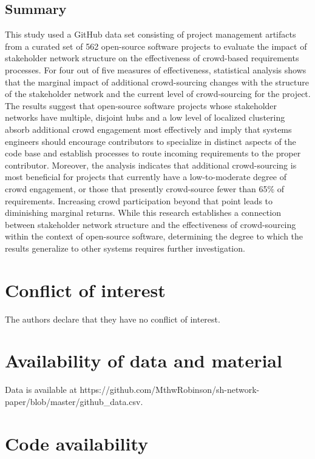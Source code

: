 \subsection{Summary}

This study used a GitHub data set consisting of project management artifacts from a curated set of 562 open-source software projects to evaluate the impact of stakeholder network structure on the effectiveness of crowd-based requirements processes. For four out of five measures of effectiveness, statistical analysis shows that the marginal impact of additional crowd-sourcing changes with the structure of the stakeholder network and the current level of crowd-sourcing for the project. The results suggest that open-source software projects whose stakeholder networks have multiple, disjoint hubs and a low level of localized clustering absorb additional crowd engagement most effectively and imply that systems engineers should encourage contributors to specialize in distinct aspects of the code base and establish processes to route incoming requirements to the proper contributor. Moreover, the analysis indicates that additional crowd-sourcing is most beneficial for projects that currently have a low-to-moderate degree of crowd engagement, or those that presently crowd-source fewer than 65\% of requirements. Increasing crowd participation beyond that point leads to diminishing marginal returns. While this research establishes a connection between stakeholder network structure and the effectiveness of crowd-sourcing within the context of open-source software, determining the degree to which the results generalize to other systems requires further investigation.

 \section*{Conflict of interest}

The authors declare that they have no conflict of interest.

\section*{Availability of data and material}

Data is available at https://github.com/MthwRobinson/sh-network-paper/blob/master/github\_data.csv.

\section*{Code availability}

